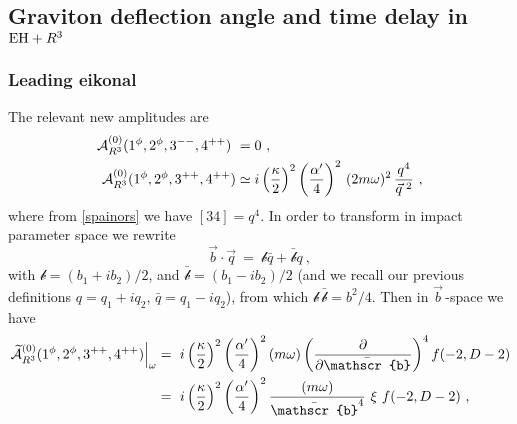 \documentclass[a4paper,11pt]{article}
\numberwithin{equation}{section}
\begin{document}
\subsection{Graviton deflection angle and time delay in \texorpdfstring{${\rm EH} + R^3$}{EH + R3}}

\subsubsection{Leading eikonal}
The relevant new amplitudes are
\begin{equation}
    \begin{split}
        \mathcal{A}_{R^3}^{(0)} (1^\phi, 2^\phi, 3^{--}, 4^{++}) \ & = 0\ , 
\\
\mathcal{A}_{R^3}^{(0)} (1^\phi, 2^\phi, 3^{++}, 4^{++}) & 
\simeq i \left({\kappa\over 2}\right)^2 \left({\alpha^\prime\over 4}\right)^2\, (2 m \omega)^2 \, {q^4 \over \vec{q}^{\, \, 2}} \ , 
    \end{split}
\end{equation} 
where from \eqref{spainors} we have $[34] = q^4$. In order to transform in impact parameter space we rewrite \begin{equation}
    \vec{b}\cdot \vec{q} \ = \ \mathscr{b} \bar{q} + \bar{\mathscr{b}} q \ , 
\end{equation}
with $\mathscr{b}= (b_1 + i b_2)/2$, and $\bar{\mathscr{b}} = (b_1 - i b_2)/2$ (and we recall our previous definitions $q=q_1 + i q_2$, $\bar{q} = q_1 - i q_2$), from which $\mathscr{b} \, \bar{\mathscr{b}} = {b^2}/{4}$. Then in $\vec{b}\,$-space we have 
\begin{equation}
    \begin{split}
        \left. \widetilde{\mathcal{A}}_{R^3}^{(0)} (1^\phi, 2^\phi, 3^{++}, 4^{++})\right|_{\omega} & = \ i \left({\kappa\over 2}\right)^2 \left({\alpha^\prime\over 4}\right)^2 ( m \omega) \left( {\partial \over \partial \bar{\mathscr{b}}}\right)^4 f(-2, D-2)\\ 
        & = \ i \left({\kappa\over 2}\right)^2 \left({\alpha^\prime\over 4}\right)^2 { ( m \omega) \over\bar{\mathscr{b}}^4} \ \xi  \ f (-2, D-2) \ ,
    \end{split}
\end{equation} 
\end{document}

